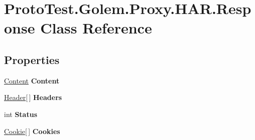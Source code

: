 \hypertarget{class_proto_test_1_1_golem_1_1_proxy_1_1_h_a_r_1_1_response}{\section{Proto\-Test.\-Golem.\-Proxy.\-H\-A\-R.\-Response Class Reference}
\label{class_proto_test_1_1_golem_1_1_proxy_1_1_h_a_r_1_1_response}
}
\subsection*{Properties}
\begin{DoxyCompactItemize}
\item 
\hypertarget{class_proto_test_1_1_golem_1_1_proxy_1_1_h_a_r_1_1_response_a16b0e0cec1dbea6278ec0c7da86fa265}{\hyperlink{class_proto_test_1_1_golem_1_1_proxy_1_1_h_a_r_1_1_content}{Content} {\bfseries Content}}\label{class_proto_test_1_1_golem_1_1_proxy_1_1_h_a_r_1_1_response_a16b0e0cec1dbea6278ec0c7da86fa265}

\item 
\hypertarget{class_proto_test_1_1_golem_1_1_proxy_1_1_h_a_r_1_1_response_af23cd9e6415bcef66a50996388e3fcaf}{\hyperlink{class_proto_test_1_1_golem_1_1_proxy_1_1_h_a_r_1_1_header}{Header}\mbox{[}$\,$\mbox{]} {\bfseries Headers}}\label{class_proto_test_1_1_golem_1_1_proxy_1_1_h_a_r_1_1_response_af23cd9e6415bcef66a50996388e3fcaf}

\item 
\hypertarget{class_proto_test_1_1_golem_1_1_proxy_1_1_h_a_r_1_1_response_a5fe3e44655b861195ed3ec274a5335d0}{int {\bfseries Status}}\label{class_proto_test_1_1_golem_1_1_proxy_1_1_h_a_r_1_1_response_a5fe3e44655b861195ed3ec274a5335d0}

\item 
\hypertarget{class_proto_test_1_1_golem_1_1_proxy_1_1_h_a_r_1_1_response_adc8c7d8202bd393325a850872a54efe2}{\hyperlink{class_proto_test_1_1_golem_1_1_proxy_1_1_h_a_r_1_1_cookie}{Cookie}\mbox{[}$\,$\mbox{]} {\bfseries Cookies}}\label{class_proto_test_1_1_golem_1_1_proxy_1_1_h_a_r_1_1_response_adc8c7d8202bd393325a850872a54efe2}


\end{DoxyCompactItemize}
